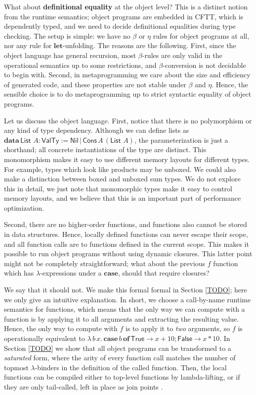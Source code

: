 \documentclass[acmsmall,screen,review,anonymous]{acmart}
\newcommand{\msf}[1]{\mathsf{#1}}
\newcommand{\mbf}[1]{\mathbf{#1}}
\newcommand{\lam}{\lambda\,}
\newcommand{\data}{\mbf{data}\,}
\newcommand{\of}{\mbf{of}\,}
\newcommand{\List}{\msf{List}\,}
\newcommand{\Nil}{\msf{Nil}}
\newcommand{\Cons}{\msf{Cons}}
\newcommand{\case}{\mbf{case\,}}
\newcommand{\VTy}{\msf{ValTy}}
\newcommand{\True}{\msf{True}}
\newcommand{\False}{\msf{False}}
\theoremstyle{remark}
\begin{document}
What about \textbf{definitional equality} at the object level? This is a
distinct notion from the runtime semantics; object programs are embedded in
CFTT, which is dependently typed, and we need to decide definitional equalities
during type checking. The setup is simple: we have no $\beta$ or $\eta$ rules
for object programs at all, nor any rule for $\mbf{let}$-unfolding. The reasons
are the following. First, since the object language has general recursion, most
$\beta$-rules are only valid in the operational semantics up to some
restrictions, and $\beta$-conversion is not decidable to begin with. Second, in
metaprogramming we care about the size and efficiency of generated code, and
these properties are not stable under $\beta$ and $\eta$.  Hence, the sensible
choice is to do metaprogramming up to strict syntactic equality of object
programs.

Let us discuss the object language. First, notice that there is no polymorphism
or any kind of type dependency. Although we can define lists as $\data \List\,A
: \VTy := \Nil\,|\,\Cons\,A\,(\List\,A)$, the parameterization is just a
shorthand; all concrete instantiations of the type are distinct. This
monomorphism makes it easy to use different memory layouts for different types.
For example, types which look like products may be unboxed. We could also make a
distinction between boxed and unboxed sum types. We do not explore this in
detail, we just note that monomorphic types make it easy to control memory
layouts, and we believe that this is an important part of performance
optimization.

Second, there are no higher-order functions, and functions also cannot be stored
in data structures. Hence, locally defined functions can never escape their
scope, and all function calls are to functions defined in the current
scope. This makes it possible to run object programs without using dynamic
closures. This latter point might not be completely straightforward; what
about the previous $f$ function which has $\lambda$-expressions under a
$\mbf{case}$, should that require closures?

We say that it should not. We make this formal formal in Section \ref{TODO};
here we only give an intuitive explanation. In short, we choose a call-by-name
runtime semantics for functions, which means that the only way we can compute
with a function is by applying it to all arguments and extracting the resulting
value.  Hence, the only way to compute with $f$ is to apply it to \emph{two}
arguments, so $f$ is operationally equivalent to $\lam b\,x.\,\case b\,\of \True
\to x + 10; \False \to x * 10$.  In Section \ref{TODO} we show that all object
programs can be transformed to a \emph{saturated} form, where the arity of every
function call matches the number of topmost $\lambda$-binders in the definition
of the called function. Then, the local functions can be compiled either to
top-level functions by lambda-lifting, or if they are only tail-called, left in
place as join points \cite{TODO}.
\end{document}
